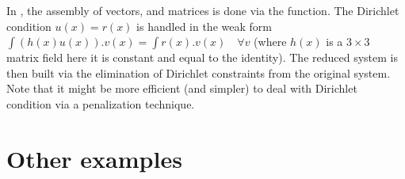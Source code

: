 \documentclass[a4paper,11pt,english]{sphinxmanual}
\begin{document}
\sphinxAtStartPar
In , the assembly of vectors, and matrices is done via the 
function. The Dirichlet condition \(u(x) = r(x)\) is handled in the weak form
\(\int (h(x)u(x)).v(x) = \int r(x).v(x)\quad \forall v\) (where \(h(x)\)
is a \(3\times3\) matrix field \textendash{} here it is constant and equal to the
identity). The reduced system  is then built via the elimination of
Dirichlet constraints from the original system. Note that it might be more
efficient (and simpler) to deal with Dirichlet condition via a penalization
technique.


\section{Other examples}
\end{document}
